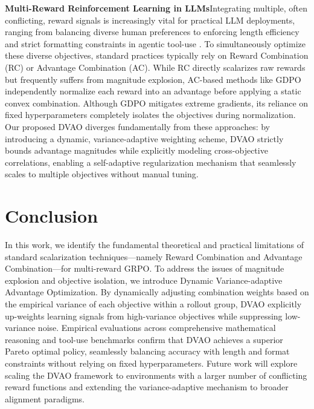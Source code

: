 \documentclass{llmxive}
\begin{document}
\textbf{Multi-Reward Reinforcement Learning in LLMs}\quad Integrating multiple, often conflicting, reward signals is increasingly vital for practical LLM deployments, ranging from balancing diverse human preferences \citep{alarm, jang2023personalized} to enforcing length efficiency \citep{gfpo, dler, luo2025o1} and strict formatting constraints in agentic tool-use \citep{toolrl, xlam}. To simultaneously optimize these diverse objectives, standard practices typically rely on Reward Combination (RC) or Advantage Combination (AC). While RC directly scalarizes raw rewards but frequently suffers from magnitude explosion, AC-based methods like GDPO \citep{gdpo} independently normalize each reward into an advantage before applying a static convex combination. Although GDPO mitigates extreme gradients, its reliance on fixed hyperparameters completely isolates the objectives during normalization. Our proposed DVAO diverges fundamentally from these approaches: by introducing a dynamic, variance-adaptive weighting scheme, DVAO strictly bounds advantage magnitudes while explicitly modeling cross-objective correlations, enabling a self-adaptive regularization mechanism that seamlessly scales to multiple objectives without manual tuning.
\section{Conclusion}

In this work, we identify the fundamental theoretical and practical limitations of standard scalarization techniques—namely Reward Combination and Advantage Combination—for multi-reward GRPO. To address the issues of magnitude explosion and objective isolation, we introduce Dynamic Variance-adaptive Advantage Optimization. By dynamically adjusting combination weights based on the empirical variance of each objective within a rollout group, DVAO explicitly up-weights learning signals from high-variance objectives while suppressing low-variance noise. Empirical evaluations across comprehensive mathematical reasoning and tool-use benchmarks confirm that DVAO achieves a superior Pareto optimal policy, seamlessly balancing accuracy with length and format constraints without relying on fixed hyperparameters. Future work will explore scaling the DVAO framework to environments with a larger number of conflicting reward functions and extending the variance-adaptive mechanism to broader alignment paradigms.




\end{document}
